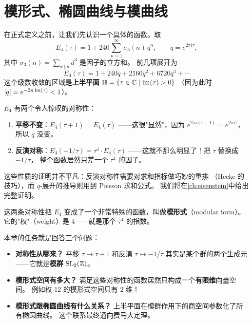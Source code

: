 \chapter{模形式、椭圆曲线与模曲线}
\label{ch:forms-curves}


在正式定义之前，让我们先认识一个具体的函数。取
\[
  E_4(\tau) = 1 + 240\sum_{n=1}^{\infty} \sigma_3(n)\, q^n,
  \qquad q = e^{2\pi i\tau},
\]
其中 $\sigma_3(n) = \sum_{d \mid n} d^3$ 是因子的立方和。
前几项展开为
\[
  E_4(\tau) = 1 + 240q + 2160q^2 + 6720q^3 + \cdots
\]
这个级数收敛的区域是\textbf{上半平面} $\mathbb{H} = \{\tau \in \mathbb{C} \mid \operatorname{im}(\tau) > 0\}$
（因为此时 $|q| = e^{-2\pi \operatorname{im}(\tau)} < 1$）。

$E_4$ 有两个令人惊叹的对称性：
\begin{enumerate}
  \item \textbf{平移不变}：$E_4(\tau + 1) = E_4(\tau)$
    ——这很"显然"，因为 $e^{2\pi i(\tau+1)} = e^{2\pi i\tau}$，
    所以 $q$ 没变。
  \item \textbf{反演对称}：$E_4(-1/\tau) = \tau^4 \cdot E_4(\tau)$
    ——这就不那么明显了！把 $\tau$ 替换成 $-1/\tau$，
    整个函数居然只差一个 $\tau^4$ 的因子。
\end{enumerate}
这些性质的证明并不平凡：反演对称性需要对求和指标做巧妙的重排
（Hecke 的技巧），而 $q$-展开的推导则用到 Poisson 求和公式。
我们将在\cref{ch:eisenstein}中给出完整证明。

这两条对称性把 $E_4$ 变成了一个非常特殊的函数，叫做\textbf{模形式}（modular form）。
它的"权"（weight）是 $4$——就是那个 $\tau^4$ 的指数。

本章的任务就是回答三个问题：
\begin{itemize}
  \item \textbf{对称性从哪来？}
    平移 $\tau \mapsto \tau+1$ 和反演 $\tau \mapsto -1/\tau$
    其实是某个群的两个生成元——它就是\textbf{模群} $\mathrm{SL}_2(\mathbb{Z})$。
  \item \textbf{模形式空间有多大？}
    满足这些对称性的函数居然只构成一个\textbf{有限维}向量空间。
    例如权 $12$ 的模形式空间只有 $2$ 维！
  \item \textbf{模形式跟椭圆曲线有什么关系？}
    上半平面在模群作用下的商空间参数化了所有椭圆曲线。
    这个联系最终通向费马大定理。
\end{itemize}


